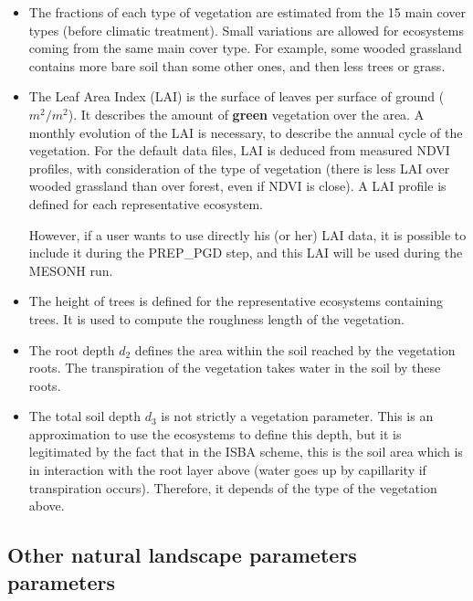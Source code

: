 \begin{itemize}
\item
The fractions of each type of vegetation are estimated from
the 15 main cover types (before climatic treatment). Small variations
are allowed for ecosystems coming from the same main cover type. For example,
some wooded grassland contains more bare soil than some other ones,
and then less trees or grass.

\item
The Leaf Area Index (LAI) is the surface of leaves per surface of ground
($m^2/m^2$). It describes the amount of {\bf green} vegetation over the
area. A monthly evolution of the LAI is necessary, to describe the annual
cycle of the vegetation.
For the default data files, LAI is deduced from measured NDVI profiles,
with consideration of the type of vegetation (there is less LAI over
wooded grassland than over forest, even if NDVI is close).
A LAI profile is defined for each representative ecosystem.

However, if a user
wants to use directly his (or her) LAI data, it is possible
to include it during the PREP\_PGD step, and this LAI will be used during the
MESONH run.

\item
The height of trees is defined for the representative ecosystems containing trees.
It is used to compute the roughness length of the vegetation.

\item
The root depth $d_2$ defines the area within the soil reached by the
vegetation roots. The transpiration of the vegetation takes water
in the soil by these roots.

\item
The total soil depth $d_3$ is not strictly a vegetation parameter.
This is an approximation to use the ecosystems to define this
depth, but it is legitimated by the fact that in the ISBA scheme, this is the
soil area which is in interaction with the root layer above (water
goes up by capillarity if transpiration occurs). Therefore, it depends
of the type of the vegetation above.
\end{itemize}





\subsection{Other natural landscape parameters parameters}

